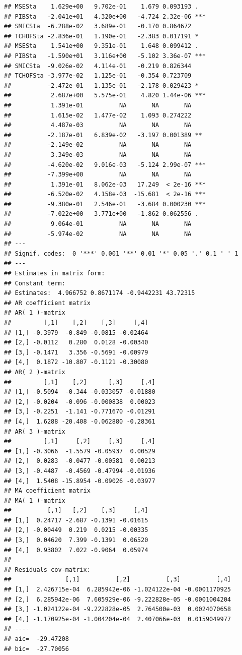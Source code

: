 \documentclass[11pt,]{article}
\begin{document}
\begin{verbatim}
## MSESta    1.629e+00   9.702e-01    1.679 0.093193 .  
## PIBSta   -2.041e+01   4.320e+00   -4.724 2.32e-06 ***
## SMICSta  -6.288e-02   3.689e-01   -0.170 0.864672    
## TCHOFSta -2.836e-01   1.190e-01   -2.383 0.017191 *  
## MSESta    1.541e+00   9.351e-01    1.648 0.099412 .  
## PIBSta   -1.590e+01   3.116e+00   -5.102 3.36e-07 ***
## SMICSta  -9.026e-02   4.114e-01   -0.219 0.826344    
## TCHOFSta -3.977e-02   1.125e-01   -0.354 0.723709    
##          -2.472e-01   1.135e-01   -2.178 0.029423 *  
##           2.687e+00   5.575e-01    4.820 1.44e-06 ***
##           1.391e-01          NA       NA       NA    
##           1.615e-02   1.477e-02    1.093 0.274222    
##           4.487e-03          NA       NA       NA    
##          -2.187e-01   6.839e-02   -3.197 0.001389 ** 
##          -2.149e-02          NA       NA       NA    
##           3.349e-03          NA       NA       NA    
##          -4.620e-02   9.016e-03   -5.124 2.99e-07 ***
##          -7.399e+00          NA       NA       NA    
##           1.391e-01   8.062e-03   17.249  < 2e-16 ***
##          -6.520e-02   4.158e-03  -15.681  < 2e-16 ***
##          -9.380e-01   2.546e-01   -3.684 0.000230 ***
##          -7.022e+00   3.771e+00   -1.862 0.062556 .  
##           9.064e-01          NA       NA       NA    
##          -5.974e-02          NA       NA       NA    
## ---
## Signif. codes:  0 '***' 0.001 '**' 0.01 '*' 0.05 '.' 0.1 ' ' 1
## --- 
## Estimates in matrix form: 
## Constant term:  
## Estimates:  4.966752 0.8671174 -0.9442231 43.72315 
## AR coefficient matrix 
## AR( 1 )-matrix 
##         [,1]    [,2]    [,3]     [,4]
## [1,] -0.3979  -0.849 -0.0815 -0.02464
## [2,] -0.0112   0.280  0.0128 -0.00340
## [3,] -0.1471   3.356 -0.5691 -0.00979
## [4,]  0.1872 -10.807 -0.1121 -0.30080
## AR( 2 )-matrix 
##         [,1]    [,2]      [,3]     [,4]
## [1,] -0.5094  -0.344 -0.033057 -0.01880
## [2,] -0.0204  -0.096 -0.000838  0.00023
## [3,] -0.2251  -1.141 -0.771670 -0.01291
## [4,]  1.6288 -20.408 -0.062880 -0.28361
## AR( 3 )-matrix 
##         [,1]     [,2]     [,3]     [,4]
## [1,] -0.3066  -1.5579 -0.05937  0.00529
## [2,]  0.0283  -0.0477 -0.00581  0.00213
## [3,] -0.4487  -0.4569 -0.47994 -0.01936
## [4,]  1.5408 -15.8954 -0.09026 -0.03977
## MA coefficient matrix 
## MA( 1 )-matrix 
##          [,1]   [,2]    [,3]     [,4]
## [1,]  0.24717 -2.687 -0.1391 -0.01615
## [2,] -0.00449  0.219  0.0215 -0.00335
## [3,]  0.04620  7.399 -0.1391  0.06520
## [4,]  0.93802  7.022 -0.9064  0.05974
##   
## Residuals cov-matrix: 
##               [,1]          [,2]          [,3]          [,4]
## [1,]  2.426715e-04  6.285942e-06 -1.024122e-04 -0.0001170925
## [2,]  6.285942e-06  7.605929e-06 -9.222828e-05 -0.0001004204
## [3,] -1.024122e-04 -9.222828e-05  2.764500e-03  0.0024070658
## [4,] -1.170925e-04 -1.004204e-04  2.407066e-03  0.0159049977
## ---- 
## aic=  -29.47208 
## bic=  -27.70056
\end{verbatim}
\end{document}
